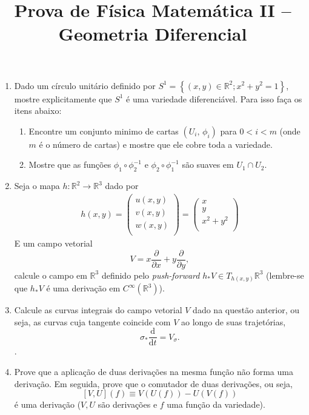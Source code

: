 \newif\ifuseseminar
\useseminartrue


\title{Prova de Física Matemática II -- Geometria Diferencial}


\begin{enumerate}
	\item Dado um círculo unitário definido por $S^1=\left\{(x,y)\in \mathbb{R}^2;
		      x^2+y^2=1\right\}$, mostre explicitamente que $S^1$ é uma variedade
	      diferenciável. Para isso faça os itens abaixo:
	      \begin{enumerate}
		      \item Encontre um conjunto minimo de cartas $(U_i,\,\phi_i)$ para $0<i<m$
		            (onde $m$ é o número de cartas) e mostre que ele cobre toda a variedade.
		      \item Mostre que as funções $\phi_1\circ\phi_2^{-1}$ e
		            $\phi_2\circ\phi_1^{-1}$ são suaves em $U_1 \cap U_2$.
	      \end{enumerate}

	\item Seja o mapa $h:\mathbb{R}^2\rightarrow\mathbb{R}^3$ dado por
	      \begin{align}
		      h(x,y) = \left(\begin{matrix}
			                     u(x,y) \\
			                     v(x,y) \\
			                     w(x,y) \\
		                     \end{matrix}\right)
		      =\left(\begin{matrix}
			             x       \\
			             y       \\
			             x^2+y^2 \\
		             \end{matrix}\right)
	      \end{align}
	      E um campo vetorial $$V=x\frac{\partial}{\partial x}+y\frac{\partial}{\partial
			      y},$$ calcule o campo em $\mathbb{R}^3$ definido pelo \emph{push-forward} $h_*
		      V\in T_{h(x,y)}\mathbb{R}^3$ (lembre-se que $h_* V$ é uma derivação em
	      $C^\infty\left(\mathbb{R}^3\right)$).
	\item Calcule as curvas integrais do campo vetorial $V$ dado na questão anterior, ou
	      seja, as curvas cuja tangente coincide com $V$ ao longo de suas trajetórias,
	      $$\sigma_*\frac{\mathrm{d}}{\mathrm{d}t} = V_\sigma.$$.
	\item Prove que a aplicação de duas derivações na mesma função não forma uma
	      derivação. Em seguida, prove que o comutador de duas derivações, ou seja,
	      $$[V,U](f)\equiv V(U(f))-U(V(f))$$ é uma derivação ($V,U$ são derivações e $f$ uma
	      função da variedade).
\end{enumerate}


